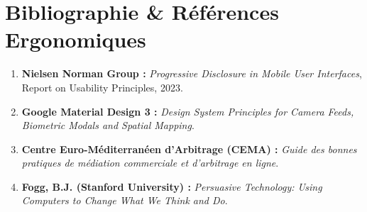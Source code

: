 \documentclass[11pt,a4paper]{report}
\begin{document}
\chapter*{Bibliographie \& Références Ergonomiques}

\begin{enumerate}[leftmargin=*]
    \item \textbf{Nielsen Norman Group :} \textit{Progressive Disclosure in Mobile User Interfaces}, Report on Usability Principles, 2023.
    \item \textbf{Google Material Design 3 :} \textit{Design System Principles for Camera Feeds, Biometric Modals and Spatial Mapping}.
    \item \textbf{Centre Euro-Méditerranéen d'Arbitrage (CEMA) :} \textit{Guide des bonnes pratiques de médiation commerciale et d'arbitrage en ligne}.
    \item \textbf{Fogg, B.J. (Stanford University) :} \textit{Persuasive Technology: Using Computers to Change What We Think and Do}.
\end{enumerate}
\end{document}
